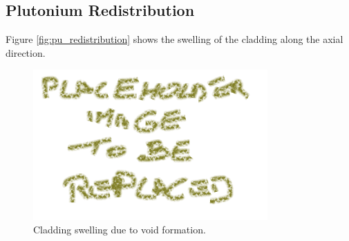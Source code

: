 \subsection{Plutonium Redistribution}
Figure \ref{fig:pu_redistribution} shows the swelling of the cladding along the axial direction.

\begin{figure}[H]
\centering
\includegraphics[width=0.8\textwidth]{placeholder.png}
\caption{Cladding swelling due to void formation.}
\label{fig:Redistribution}
\end{figure}
